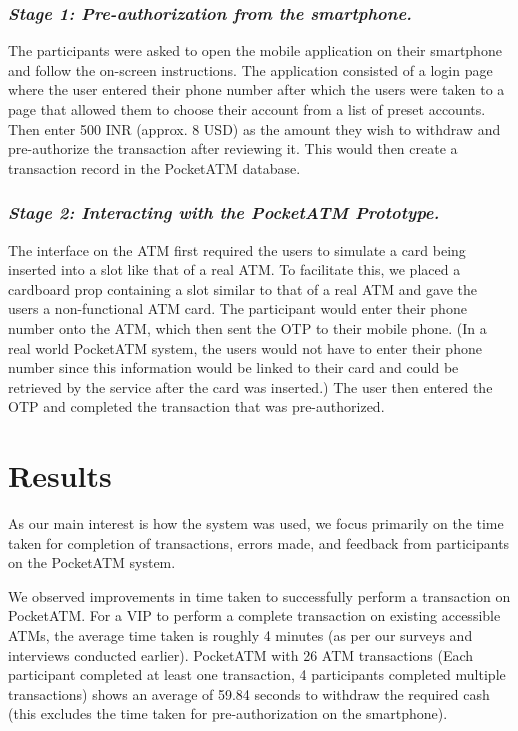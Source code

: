 \subsubsection*{\textit{\textbf{Stage 1: Pre-authorization from the smartphone.}}}

The participants were asked to open the mobile application on their smartphone and follow the on-screen instructions. The application consisted of a login page where the user entered their phone number after which the users were taken to a page that allowed them to choose their account from a list of preset accounts. Then enter 500 INR (approx. 8 USD) as the amount they wish to withdraw and pre-authorize the transaction after reviewing it. This would then create a transaction record in the PocketATM database.

\subsubsection*{\textit{\textbf{Stage 2: Interacting with the PocketATM Prototype.}}}

The interface on the ATM first required the users to simulate a card being inserted into a slot like that of a real ATM. To facilitate this, we placed a cardboard prop containing a slot similar to that of a real ATM and gave the users a non-functional ATM card. The participant would enter their phone number onto the ATM, which then sent the OTP to their mobile phone. (In a real world PocketATM system, the users would not have to enter their phone number since this information would be linked to their card and could be retrieved by the service after the card was inserted.) The user then entered the OTP and completed the transaction that was pre-authorized.

\section{Results}
\label{sec:results}

As our main interest is how the system was used, we focus primarily on the time taken for completion of transactions, errors made, and feedback from participants on the PocketATM system. 

We observed improvements in time taken to successfully perform a transaction on PocketATM. For a VIP to perform a complete transaction on existing accessible ATMs, the average time taken is roughly 4 minutes (as per our surveys and interviews conducted earlier). PocketATM with 26 ATM transactions (Each participant completed at least one transaction, 4 participants completed multiple transactions) shows an average of 59.84 seconds to withdraw the required cash (this excludes the time taken for pre-authorization on the smartphone).  

